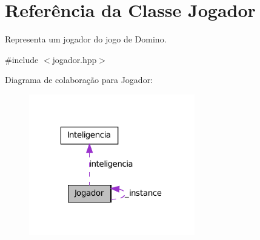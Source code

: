 \hypertarget{classJogador}{
\section{Referência da Classe Jogador}
\label{classJogador}
}


Representa um jogador do jogo de Domino.  




{\ttfamily \#include $<$jogador.hpp$>$}



Diagrama de colaboração para Jogador:\nopagebreak
\begin{figure}[H]
\begin{center}
\leavevmode
\includegraphics[width=205pt]{classJogador__coll__graph}
\end{center}
\end{figure}
